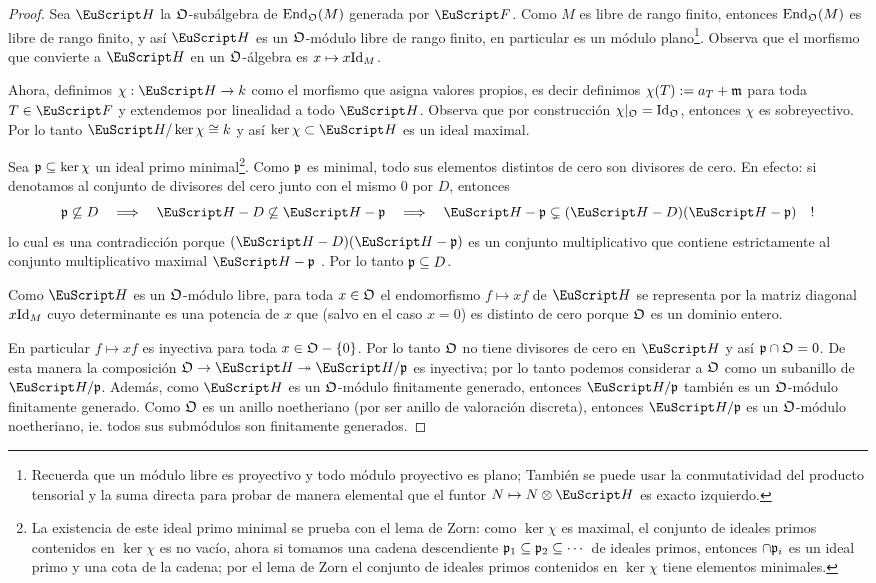 \documentclass[../../tesis_maestria]{subfiles}
\begin{document}
\begin{proof}
  Sea $\Hh$ la $\mathfrak{O}$-sub\'algebra de $\mathrm{End}_{\mathfrak{O}}(M)$ generada por $\Ff$. Como $M$ es libre
  de rango finito, entonces $\mathrm{End}_{\mathfrak{O}}(M)$ es libre de rango finito, y as\'i $\Hh$ es un
  $\mathfrak{O}$-m\'odulo libre de rango finito, en particular es un m\'odulo plano\footnote{Recuerda
    que un m\'odulo libre es proyectivo y todo m\'odulo proyectivo es plano; Tambi\'en se
    puede usar la conmutatividad del producto tensorial y la suma directa para probar de
    manera elemental que el funtor $N\mapsto N\otimes\Hh$ es exacto izquierdo.}. Observa
  que el morfismo que convierte a $\Hh$ en un $\mathfrak{O}$-\'algebra es $x\mapsto x\mathrm{Id}_M$.

  Ahora, definimos $\chi:\Hh\ra k$ como el morfismo que asigna valores propios,
  es decir definimos $\chi(T):=a_T+\mathfrak{m}$ para toda $T\in\Ff$ y extendemos por linealidad a todo
  $\Hh$. Observa que  por construcci\'on $\chi|_{\mathfrak{O}}=\mathrm{Id}_{\mathfrak{O}}$, entonces $\chi$ es sobreyectivo.
  Por lo tanto $\Hh/\ker\chi\cong k$ y as\'i $\ker\chi\subset\Hh$ es un ideal maximal.

  Sea $\mathfrak{p}\subseteq\ker\chi$ un ideal primo minimal\footnote{La existencia de este ideal primo
    minimal se prueba con el lema de Zorn: como $\ker\chi$ es maximal, el conjunto de ideales
    primos contenidos en $\ker\chi$ es no vac\'io, ahora si tomamos una cadena descendiente
    $\mathfrak{p}_1\subseteq\mathfrak{p}_2\subseteq\cdots$ de ideales primos, entonces $\cap \mathfrak{p}_i$ es un ideal primo
    y una cota de la cadena; por el lema de Zorn el conjunto de ideales primos contenidos en
    $\ker\chi$ tiene elementos minimales.}.
  Como $\mathfrak{p}$ es minimal, todo sus elementos distintos de cero son divisores de cero. En efecto:
  si denotamos al conjunto de divisores del cero junto con el mismo 0 por $D$, entonces
  \[
    \p\not\subseteq D\quad\then\quad
    \Hh-D\not\subseteq\Hh-\p \quad\then\quad
    \Hh-\p\subsetneq (\Hh-D)(\Hh-\p)\quad!
  \]
  lo cual es una contradicci\'on porque $(\Hh-D)(\Hh-\p)$ es un conjunto multiplicativo que
  contiene estrictamente al conjunto multiplicativo maximal $\Hh-\p$ \cite[\S3]{AtiyahITCA}.
  Por lo tanto $\mathfrak{p}\subseteq D$.

  Como $\Hh$ es un $\mathfrak{O}$-m\'odulo libre, para toda $x\in\mathfrak{O}$ el endomorfismo $f\mapsto xf$
  de $\Hh$ se representa por la matriz diagonal $x\mathrm{Id}_M$ cuyo determinante es una potencia
  de $x$ que (salvo en el caso $x=0$) es distinto de cero porque $\mathfrak{O}$ es un dominio entero.
  
  En particular $f\mapsto xf$ es inyectiva para toda $x\in\mathfrak{O}-\{0\}$. Por lo tanto $\mathfrak{O}$ no
  tiene divisores de cero en $\Hh$ y as\'i $\mathfrak{p}\cap\mathfrak{O}=0$. De esta manera la
  composici\'on $\fO\ra\Hh\epi\Hh/\p$ es inyectiva; por lo tanto podemos considerar
  a $\mathfrak{O}$ como un subanillo de $\Hh/\p$. Adem\'as, como $\Hh$ es un $\mathfrak{O}$-m\'odulo finitamente
  generado, entonces $\Hh/\p$ tambi\'en es un $\mathfrak{O}$-m\'odulo finitamente generado. Como
  $\mathfrak{O}$ es un anillo noetheriano (por ser anillo de valoraci\'on discreta), entonces $\Hh/\p$ es
  un $\mathfrak{O}$-m\'odulo noetheriano, ie. todos sus subm\'odulos son finitamente generados.


\end{proof}
\end{document}
